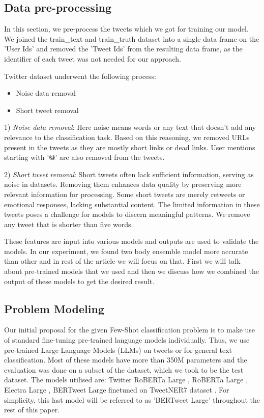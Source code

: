 \documentclass[]{ceurart}
\begin{document}
\subsection{Data pre-processing}
In this section, we pre-process the tweets which we got for training our model. We joined the train\_text and train\_truth dataset into a single data frame on the 'User Ids' and removed the 'Tweet Ids' from the resulting data frame, as the identifier of each tweet was not needed for our approach.

Twitter dataset underwent the following process:
\begin{itemize}
    \item Noise data removal
    \item Short tweet removal
\end{itemize}

1) \textit{Noise data removal}: Here noise means words or any text that doesn't add any relevance to the classification task. Based on this reasoning, we removed URLs present in the tweets as they are mostly short links or dead links. User mentions starting with '\textbf{@}' are also removed from the tweets.

2) \textit{Short tweet removal}: Short tweets often lack sufficient information, serving as noise in datasets. Removing them enhances data quality by preserving more relevant information for processing. Some short tweets are merely retweets or emotional responses, lacking substantial content. The limited information in these tweets poses a challenge for models to discern meaningful patterns. We remove any tweet that is shorter than five words.

 These features are input into various models and outputs are used to validate the models. In our experiment, we found two body ensemble model more accurate than other and in rest of the article we will focus on that. First we will talk about pre-trained models that we used and then we discuss how we combined the output of these models to get the desired result.

 \subsection{Problem Modeling}
Our initial proposal for the given Few-Shot classification problem is to make use of standard fine-tuning pre-trained language models individually. Thus, we use pre-trained Large Language Models (LLMs) on tweets or for general text classification. Most of these models have more than 350M parameters and the evaluation was done on a subset of the dataset, which we took to be the test dataset. The models utilised are: Twitter RoBERTa Large \cite{loureiro2022timelms}, RoBERTa Large \cite{liu2019roberta}, Electra Large \cite{clark2020electra}, BERTweet Large \cite{bertweet} finetuned on TweetNER7 dataset \cite{ushio-etal-2022-tweet, ushio-camacho-collados-2021-ner}. For simplicity, this last model will be referred to as 'BERTweet Large' throughout the rest of this paper.
\end{document}
